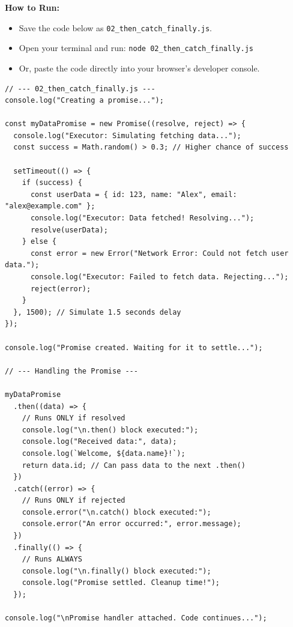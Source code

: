 \documentclass[12pt,letterpaper]{article}
\newenvironment{macterminal}{%
    \begin{mdframed}[
        linecolor=terminalFrame,
        backgroundcolor=terminalBg,
        roundcorner=5pt,
        skipabove=5pt,
        skipbelow=5pt,
        linewidth=1pt,
        innertopmargin=5pt,
        frametitle={%
            \tikz[baseline=(current bounding box.east), outer sep=0pt]{
                \fill[red!80!black] (0,0) circle (5pt);
                \fill[yellow!80!black] (0.7,0) circle (5pt);
                \fill[green!70!black] (1.4,0) circle (5pt);
            }
        },
        frametitlealignment=\raggedright,
        frametitleaboveskip=8pt,
        frametitlebelowskip=0pt,
    ]
}{%
    \end{mdframed}%
}
\begin{document}
\textbf{How to Run:}
\begin{itemize}
    \item Save the code below as \verb|02_then_catch_finally.js|.
    \item Open your terminal and run: \verb|node 02_then_catch_finally.js|
    \item Or, paste the code directly into your browser's developer console.
\end{itemize}
\begin{macterminal}
\begin{lstlisting}
// --- 02_then_catch_finally.js ---
console.log("Creating a promise...");

const myDataPromise = new Promise((resolve, reject) => {
  console.log("Executor: Simulating fetching data...");
  const success = Math.random() > 0.3; // Higher chance of success

  setTimeout(() => {
    if (success) {
      const userData = { id: 123, name: "Alex", email: "alex@example.com" };
      console.log("Executor: Data fetched! Resolving...");
      resolve(userData);
    } else {
      const error = new Error("Network Error: Could not fetch user data.");
      console.log("Executor: Failed to fetch data. Rejecting...");
      reject(error);
    }
  }, 1500); // Simulate 1.5 seconds delay
});

console.log("Promise created. Waiting for it to settle...");

// --- Handling the Promise ---

myDataPromise
  .then((data) => {
    // Runs ONLY if resolved
    console.log("\n.then() block executed:");
    console.log("Received data:", data);
    console.log(`Welcome, ${data.name}!`);
    return data.id; // Can pass data to the next .then()
  })
  .catch((error) => {
    // Runs ONLY if rejected
    console.error("\n.catch() block executed:");
    console.error("An error occurred:", error.message);
  })
  .finally(() => {
    // Runs ALWAYS
    console.log("\n.finally() block executed:");
    console.log("Promise settled. Cleanup time!");
  });

console.log("\nPromise handler attached. Code continues...");
\end{lstlisting}
\end{macterminal}
\end{document}

